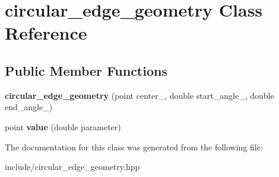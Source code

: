\hypertarget{classcircular__edge__geometry}{
\section{circular\_\-edge\_\-geometry Class Reference}
\label{classcircular__edge__geometry}
}
\subsection*{Public Member Functions}
\begin{DoxyCompactItemize}
\item 
\hypertarget{classcircular__edge__geometry_a0efaab032d5334baa83aa80ebc53fc9b}{
{\bfseries circular\_\-edge\_\-geometry} (point center\_\-, double start\_\-angle\_\-, double end\_\-angle\_\-)}
\label{classcircular__edge__geometry_a0efaab032d5334baa83aa80ebc53fc9b}

\item 
\hypertarget{classcircular__edge__geometry_abe44d1d8bb11bf92fc105757f478ff48}{
point {\bfseries value} (double parameter)}
\label{classcircular__edge__geometry_abe44d1d8bb11bf92fc105757f478ff48}

\end{DoxyCompactItemize}


The documentation for this class was generated from the following file:\begin{DoxyCompactItemize}
\item 
include/circular\_\-edge\_\-geometry.hpp\end{DoxyCompactItemize}
